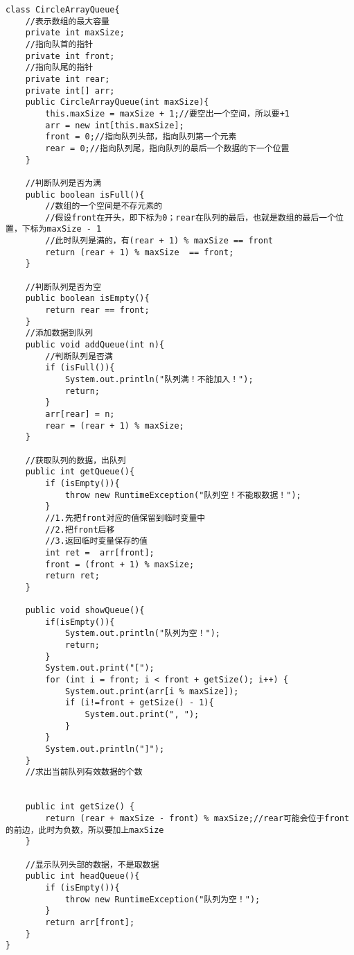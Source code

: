 \documentclass[a4paper]{report}
\begin{document}
\begin{lstlisting}
class CircleArrayQueue{
    //表示数组的最大容量
    private int maxSize;
    //指向队首的指针
    private int front;
    //指向队尾的指针
    private int rear;
    private int[] arr;
    public CircleArrayQueue(int maxSize){
        this.maxSize = maxSize + 1;//要空出一个空间，所以要+1
        arr = new int[this.maxSize];
        front = 0;//指向队列头部，指向队列第一个元素
        rear = 0;//指向队列尾，指向队列的最后一个数据的下一个位置
    }

    //判断队列是否为满
    public boolean isFull(){
        //数组的一个空间是不存元素的
        //假设front在开头，即下标为0；rear在队列的最后，也就是数组的最后一个位置，下标为maxSize - 1
        //此时队列是满的，有(rear + 1) % maxSize == front
        return (rear + 1) % maxSize  == front;
    }

    //判断队列是否为空
    public boolean isEmpty(){
        return rear == front;
    }
    //添加数据到队列
    public void addQueue(int n){
        //判断队列是否满
        if (isFull()){
            System.out.println("队列满！不能加入！");
            return;
        }
        arr[rear] = n;
        rear = (rear + 1) % maxSize;
    }

    //获取队列的数据，出队列
    public int getQueue(){
        if (isEmpty()){
            throw new RuntimeException("队列空！不能取数据！");
        }
        //1.先把front对应的值保留到临时变量中
        //2.把front后移
        //3.返回临时变量保存的值
        int ret =  arr[front];
        front = (front + 1) % maxSize;
        return ret;
    }

    public void showQueue(){
        if(isEmpty()){
            System.out.println("队列为空！");
            return;
        }
        System.out.print("[");
        for (int i = front; i < front + getSize(); i++) {
            System.out.print(arr[i % maxSize]);
            if (i!=front + getSize() - 1){
                System.out.print(", ");
            }
        }
        System.out.println("]");
    }
    //求出当前队列有效数据的个数


    public int getSize() {
        return (rear + maxSize - front) % maxSize;//rear可能会位于front的前边，此时为负数，所以要加上maxSize
    }

    //显示队列头部的数据，不是取数据
    public int headQueue(){
        if (isEmpty()){
            throw new RuntimeException("队列为空！");
        }
        return arr[front];
    }
}
\end{lstlisting}
\end{document}
